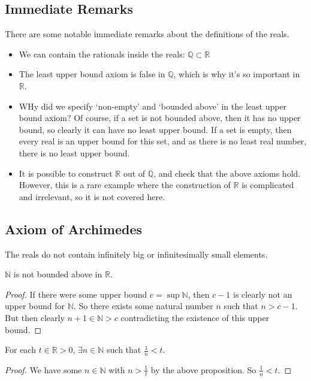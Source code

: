 \subsection{Immediate Remarks}
There are some notable immediate remarks about the definitions of the reals.
\begin{itemize}
	\item We can contain the rationals inside the reals: $\mathbb Q \subset \mathbb R$
	\item The least upper bound axiom is false in $\mathbb Q$, which is why it's so important in $\mathbb R$.
	\item WHy did we specify `non-empty' and `bounded above' in the least upper bound axiom? Of course, if a set is not bounded above, then it has no upper bound, so clearly it can have no least upper bound. If a set is empty, then every real is an upper bound for this set, and as there is no least real number, there is no least upper bound.
	\item It is possible to construct $\mathbb R$ out of $\mathbb Q$, and check that the above axioms hold. However, this is a rare example where the construction of $\mathbb R$ is complicated and irrelevant, so it is not covered here.
\end{itemize}

\subsection{Axiom of Archimedes}
The reals do not contain infinitely big or infinitesimally small elements.
\begin{proposition}
	$\mathbb N$ is not bounded above in $\mathbb R$.
\end{proposition}
\begin{proof}
	If there were some upper bound $c = \sup \mathbb N$, then $c-1$ is clearly not an upper bound for $\mathbb N$. So there exists some natural number $n$ such that $n > c-1$. But then clearly $n+1 \in \mathbb N > c$ contradicting the existence of this upper bound.
\end{proof}
\begin{corollary}
	For each $t \in \mathbb R > 0$, $\exists n \in \mathbb N$ such that $\frac{1}{n} < t$.
\end{corollary}
\begin{proof}
	We have some $n \in \mathbb N$ with $n > \frac{1}{t}$ by the above proposition. So $\frac{1}{n} < t$.
\end{proof}

